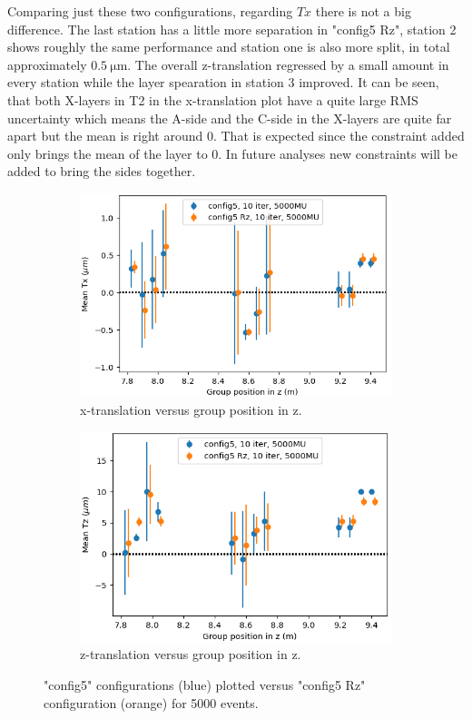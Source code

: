 Comparing just these two configurations, regarding $Tx$ there is not a big difference.
The last station has a little more separation in "config5 Rz", station 2 shows roughly the same performance and station one is also more split, in total approximately
$\SI{0.5}{\micro\metre}$. The overall z-translation regressed by a small amount in every station while the layer spearation in station 3 improved.
It can be seen, that both X-layers in T2 in the x-translation plot have a quite large RMS uncertainty which means the A-side and the C-side in the X-layers are quite far apart but the mean is right around 0. That is expected since the constraint added only brings the mean of the layer to 0. In future analyses new constraints will be added to bring the sides together.
\begin{figure}
  \centering
  \begin{subfigure}[b]{0.48\textwidth}
    \centering
    \includegraphics[width=\textwidth]{plots/renewed_plots/Tx_config5.png}
    \caption{x-translation versus group position in z.}
    \label{fig:config5_Tx}
  \end{subfigure}
  \hfill
  \begin{subfigure}[b]{0.48\textwidth}
    \centering
    \includegraphics[width=\textwidth]{plots/renewed_plots/Tz_config5.png}
    \caption{z-translation versus group position in z.}
    \label{fig:config5_Tz}
  \end{subfigure}
  \caption{"config5" configurations (blue) plotted versus "config5 Rz" configuration (orange) for 5000 events.}
  \label{fig:config5_tra}
\end{figure}

